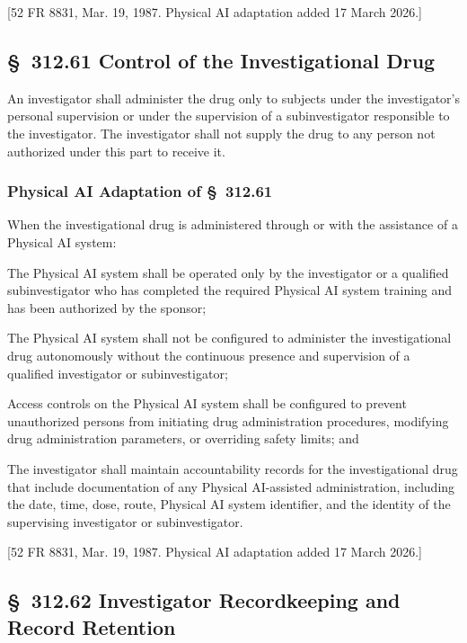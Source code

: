 [52 FR 8831, Mar. 19, 1987. Physical AI adaptation added 17 March 2026.]

\subsection{\S~312.61 Control of the Investigational Drug}

An investigator shall administer the drug only to subjects under the investigator's personal supervision or under the supervision of a subinvestigator responsible to the investigator. The investigator shall not supply the drug to any person not authorized under this part to receive it.

\subsubsection{Physical AI Adaptation of \S~312.61}

When the investigational drug is administered through or with the assistance of a Physical AI system:

\begin{description}[leftmargin=0.8cm,style=sameline]
\item[(a)] The Physical AI system shall be operated only by the investigator or a qualified subinvestigator who has completed the required Physical AI system training and has been authorized by the sponsor;
\item[(b)] The Physical AI system shall not be configured to administer the investigational drug autonomously without the continuous presence and supervision of a qualified investigator or subinvestigator;
\item[(c)] Access controls on the Physical AI system shall be configured to prevent unauthorized persons from initiating drug administration procedures, modifying drug administration parameters, or overriding safety limits; and
\item[(d)] The investigator shall maintain accountability records for the investigational drug that include documentation of any Physical AI-assisted administration, including the date, time, dose, route, Physical AI system identifier, and the identity of the supervising investigator or subinvestigator.
\end{description}

[52 FR 8831, Mar. 19, 1987. Physical AI adaptation added 17 March 2026.]

\subsection{\S~312.62 Investigator Recordkeeping and Record Retention}

